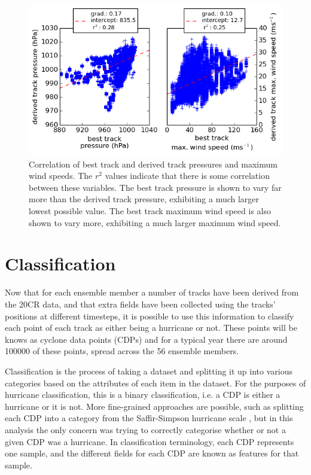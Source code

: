 \documentclass[pdftex,12pt,a4paper]{report}
\begin{document}
\begin{figure}[ht!]
    \centering
    \includegraphics[width=\textwidth]{figures/press_max_ws_corr_2005}
    \vspace{-10pt}
    \caption{Correlation of best track and derived track pressures and maximum wind speeds. The
        $r^2$ values indicate that there is some correlation between these variables. The best track
        pressure is shown to vary far more than the derived track pressure, exhibiting a much larger lowest
        possible value. The best track maximum wind speed is also shown to vary more, exhibiting a much
        larger maximum wind speed. }
    \label{fig:press_max_ws_corr_2005}
\end{figure}

\newpage
\section{Classification}
\label{sec:classification}

Now that for each ensemble member a number of tracks have been derived from the 20CR data, and that
extra fields have been collected using the tracks' positions at different timesteps, it is possible
to use this information to classify each point of each track as either being a hurricane or not.
These points will be knows as cyclone data points (CDPs) and for a typical year there are around
100000 of these points, spread across the 56 ensemble members.

Classification is the process of taking a dataset and splitting it up into various categories based
on the attributes of each item in the dataset. For the purposes of hurricane classification, this is
a binary classification, i.e. a CDP is either a hurricane or it is not. More fine-grained approaches
are possible, such as splitting each CDP into a category from the Saffir-Simpson hurricane scale
\parencite{simpson1974hurricane}, but in this analysis the only concern was trying to correctly
categorise whether or not a given CDP was a hurricane. In classification terminology, each CDP
represents one sample, and the different fields for each CDP are known as features for that sample.
\end{document}
